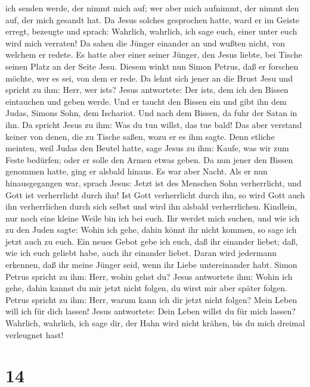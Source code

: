ich senden werde, der nimmt mich auf; wer aber mich aufnimmt, der nimmt
den auf, der mich gesandt hat.  Da Jesus solches
gesprochen hatte, ward er im Geiste erregt, bezeugte und sprach:
Wahrlich, wahrlich, ich sage euch, einer unter euch wird mich verraten!
 Da sahen die Jünger einander an und wußten nicht, von
welchem er redete.  Es hatte aber einer seiner Jünger,
den Jesus liebte, bei Tische seinen Platz an der Seite Jesu.
 Diesem winkt nun Simon Petrus, daß er forschen möchte,
wer es sei, von dem er rede.  Da lehnt sich jener an die
Brust Jesu und spricht zu ihm: Herr, wer ist\textquotesingle s?
 Jesus antwortete: Der ist\textquotesingle s, dem ich den
Bissen eintauchen und geben werde. Und er taucht den Bissen ein und gibt
ihn dem Judas, Simons Sohn, dem Ischariot.  Und nach dem
Bissen, da fuhr der Satan in ihn. Da spricht Jesus zu ihm: Was du tun
willst, das tue bald!  Das aber verstand keiner von
denen, die zu Tische saßen, wozu er es ihm sagte.  Denn
etliche meinten, weil Judas den Beutel hatte, sage Jesus zu ihm: Kaufe,
was wir zum Feste bedürfen; oder er solle den Armen etwas geben.
 Da nun jener den Bissen genommen hatte, ging er alsbald
hinaus. Es war aber Nacht.  Als er nun hinausgegangen
war, sprach Jesus: Jetzt ist des Menschen Sohn verherrlicht, und Gott
ist verherrlicht durch ihn!  Ist Gott verherrlicht durch
ihn, so wird Gott auch ihn verherrlichen durch sich selbst und wird ihn
alsbald verherrlichen.  Kindlein, nur noch eine kleine
Weile bin ich bei euch. Ihr werdet mich suchen, und wie ich zu den Juden
sagte: Wohin ich gehe, dahin könnt ihr nicht kommen, so sage ich jetzt
auch zu euch.  Ein neues Gebot gebe ich euch, daß ihr
einander liebet; daß, wie ich euch geliebt habe, auch ihr einander
liebet.  Daran wird jedermann erkennen, daß ihr meine
Jünger seid, wenn ihr Liebe untereinander habt.  Simon
Petrus spricht zu ihm: Herr, wohin gehst du? Jesus antwortete ihm: Wohin
ich gehe, dahin kannst du mir jetzt nicht folgen, du wirst mir aber
später folgen.  Petrus spricht zu ihm: Herr, warum kann
ich dir jetzt nicht folgen? Mein Leben will ich für dich lassen!
 Jesus antwortete: Dein Leben willst du für mich lassen?
Wahrlich, wahrlich, ich sage dir, der Hahn wird nicht krähen, bis du
mich dreimal verleugnet hast!

\hypertarget{section-13}{%
\section{14}\label{section-13}}

